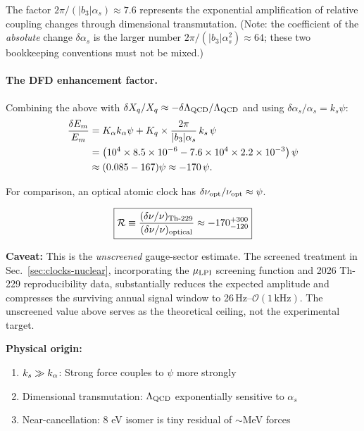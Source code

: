 The factor $2\pi/(|b_3|\alpha_s) \approx 7.6$ represents the exponential amplification of relative coupling changes through dimensional transmutation.  (Note: the coefficient of the \emph{absolute} change $\delta\alpha_s$ is the larger number $2\pi/(|b_3|\alpha_s^2) \approx 64$; these two bookkeeping conventions must not be mixed.)

\paragraph{The DFD enhancement factor.}
Combining the above with $\delta X_q/X_q \approx -\delta\Lambda_{\rm QCD}/\Lambda_{\rm QCD}$ and using $\delta\alpha_s/\alpha_s = k_s\psi$:
\begin{align}
\frac{\delta E_m}{E_m} &= K_\alpha k_\alpha\psi + K_q \times \frac{2\pi}{|b_3|\alpha_s}\,k_s\,\psi \nonumber\\
&= \left(10^4 \times 8.5 \times 10^{-6} - 7.6 \times 10^4 \times 2.2 \times 10^{-3}\right)\psi \nonumber\\
&\approx (0.085 - 167)\psi \approx -170\,\psi.
\end{align}

For comparison, an optical atomic clock has $\delta\nu_{\rm opt}/\nu_{\rm opt} \approx \psi$.

\begin{tcolorbox}[colback=red!5!white, colframe=red!60!black, title=Nuclear Clock Enhancement: Unscreened Gauge-Sector Estimate]
\begin{equation}\label{eq:enhancement}
\boxed{\mathcal{R} \equiv \frac{(\delta\nu/\nu)_{\rm Th\text{-}229}}{(\delta\nu/\nu)_{\rm optical}} \approx -170^{+300}_{-120}}
\end{equation}

\textbf{Caveat:} This is the \emph{unscreened} gauge-sector estimate.  The screened treatment in Sec.~\ref{sec:clocks-nuclear}, incorporating the $\mu_{\rm LPI}$ screening function and 2026 Th-229 reproducibility data, substantially reduces the expected amplitude and compresses the surviving annual signal window to 26\,Hz--$\mathcal{O}(1\,\mathrm{kHz})$.  The unscreened value above serves as the theoretical ceiling, not the experimental target.

\textbf{Physical origin:}
\begin{enumerate}
\item $k_s \gg k_\alpha$: Strong force couples to $\psi$ more strongly
\item Dimensional transmutation: $\Lambda_{\rm QCD}$ exponentially sensitive to $\alpha_s$
\item Near-cancellation: 8 eV isomer is tiny residual of ${\sim}$MeV forces
\end{enumerate}
\end{tcolorbox}

